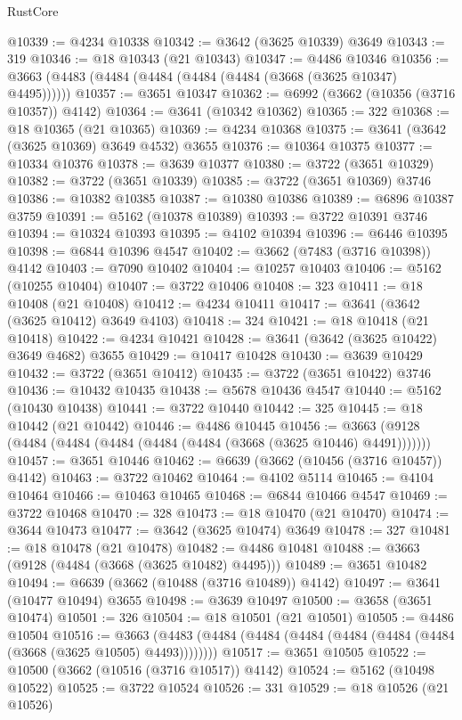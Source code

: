 \begin{lexlean}{RustCore}
\begin{coremodule}
@10339 := @4234 @10338
@10342 := @3642 (@3625 @10339) @3649
@10343 := 319
@10346 := @18 @10343 (@21 @10343)
@10347 := @4486 @10346
@10356 := @3663 (@4483 (@4484 (@4484 (@4484 (@4484 (@3668 (@3625 @10347) @4495))))))
@10357 := @3651 @10347
@10362 := @6992 (@3662 (@10356 (@3716 @10357)) @4142)
@10364 := @3641 (@10342 @10362)
@10365 := 322
@10368 := @18 @10365 (@21 @10365)
@10369 := @4234 @10368
@10375 := @3641 (@3642 (@3625 @10369) @3649 @4532) @3655
@10376 := @10364 @10375
@10377 := @10334 @10376
@10378 := @3639 @10377
@10380 := @3722 (@3651 @10329)
@10382 := @3722 (@3651 @10339)
@10385 := @3722 (@3651 @10369) @3746
@10386 := @10382 @10385
@10387 := @10380 @10386
@10389 := @6896 @10387 @3759
@10391 := @5162 (@10378 @10389)
@10393 := @3722 @10391 @3746
@10394 := @10324 @10393
@10395 := @4102 @10394
@10396 := @6446 @10395
@10398 := @6844 @10396 @4547
@10402 := @3662 (@7483 (@3716 @10398)) @4142
@10403 := @7090 @10402
@10404 := @10257 @10403
@10406 := @5162 (@10255 @10404)
@10407 := @3722 @10406
@10408 := 323
@10411 := @18 @10408 (@21 @10408)
@10412 := @4234 @10411
@10417 := @3641 (@3642 (@3625 @10412) @3649 @4103)
@10418 := 324
@10421 := @18 @10418 (@21 @10418)
@10422 := @4234 @10421
@10428 := @3641 (@3642 (@3625 @10422) @3649 @4682) @3655
@10429 := @10417 @10428
@10430 := @3639 @10429
@10432 := @3722 (@3651 @10412)
@10435 := @3722 (@3651 @10422) @3746
@10436 := @10432 @10435
@10438 := @5678 @10436 @4547
@10440 := @5162 (@10430 @10438)
@10441 := @3722 @10440
@10442 := 325
@10445 := @18 @10442 (@21 @10442)
@10446 := @4486 @10445
@10456 := @3663 (@9128 (@4484 (@4484 (@4484 (@4484 (@4484 (@3668 (@3625 @10446) @4491)))))))
@10457 := @3651 @10446
@10462 := @6639 (@3662 (@10456 (@3716 @10457)) @4142)
@10463 := @3722 @10462
@10464 := @4102 @5114
@10465 := @4104 @10464
@10466 := @10463 @10465
@10468 := @6844 @10466 @4547
@10469 := @3722 @10468
@10470 := 328
@10473 := @18 @10470 (@21 @10470)
@10474 := @3644 @10473
@10477 := @3642 (@3625 @10474) @3649
@10478 := 327
@10481 := @18 @10478 (@21 @10478)
@10482 := @4486 @10481
@10488 := @3663 (@9128 (@4484 (@3668 (@3625 @10482) @4495)))
@10489 := @3651 @10482
@10494 := @6639 (@3662 (@10488 (@3716 @10489)) @4142)
@10497 := @3641 (@10477 @10494) @3655
@10498 := @3639 @10497
@10500 := @3658 (@3651 @10474)
@10501 := 326
@10504 := @18 @10501 (@21 @10501)
@10505 := @4486 @10504
@10516 := @3663 (@4483 (@4484 (@4484 (@4484 (@4484 (@4484 (@4484 (@3668 (@3625 @10505) @4493))))))))
@10517 := @3651 @10505
@10522 := @10500 (@3662 (@10516 (@3716 @10517)) @4142)
@10524 := @5162 (@10498 @10522)
@10525 := @3722 @10524
@10526 := 331
@10529 := @18 @10526 (@21 @10526)

\end{coremodule}
\end{lexlean}
